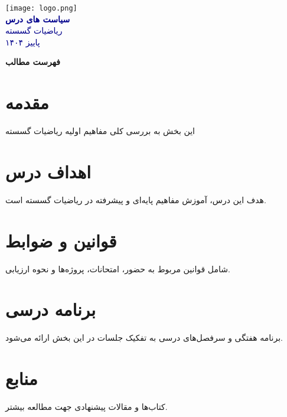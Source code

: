 \documentclass[a4paper,12pt]{article}
\begin{document}
	
	\begin{center}
		\vspace*{4cm}
		\texttt{[image: logo.png]} \\[1cm]
		\textcolor{darkblue}{\large \textbf{سیاست های درس}} \\
		\textcolor{darkblue}{ریاضیات گسسته} \\
		\textcolor{darkblue}{پاییز ۱۴۰۴}



	\end{center}
	
	\clearpage
	\thispagestyle{empty}
	\begin{center}
		\vspace*{1.5cm}
		{\LARGE \textbf{فهرست مطالب}} \\[0.5cm]
	\end{center}
	\vspace{0.5cm}
	\tableofcontents
	
	\clearpage
	\section{مقدمه}
	{\color{black}
		این بخش به بررسی کلی مفاهیم اولیه ریاضیات گسسته
		\lipsum[1][1-3]
	}
	
	\section{اهداف درس}
	{\color{black}
		هدف این درس، آموزش مفاهیم پایه‌ای و پیشرفته در ریاضیات گسسته ‌است.
		\lipsum[2][1-3]
	}
	
	\section{قوانین و ضوابط}
	{\color{black}
		شامل قوانین مربوط به حضور، امتحانات، پروژه‌ها و نحوه ارزیابی.
		\lipsum[3][1-3]
	}
	
	\section{برنامه درسی}
	{\color{black}
		برنامه هفتگی و سرفصل‌های درسی به تفکیک جلسات در این بخش ارائه می‌شود.
		\lipsum[4][1-3]
	}
	
	\section{منابع}
	{\color{black}
		کتاب‌ها و مقالات پیشنهادی جهت مطالعه بیشتر.
		\lipsum[5][1-3]
	}
	
\end{document}

